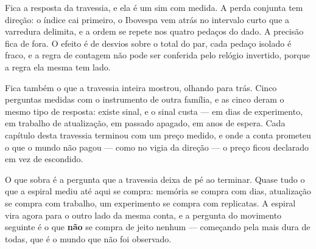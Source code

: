 Fica a resposta da travessia, e ela é um sim com medida. A perda conjunta tem direção: o índice cai
primeiro, o Ibovespa vem atrás no intervalo curto que a varredura delimita, e a ordem se repete nos
quatro pedaços do dado. A precisão fica de fora. O efeito é de \numConjuntaDesvios{} desvios sobre o total do
par, cada pedaço isolado é fraco, e a regra de contagem não pode ser conferida pelo relógio
invertido, porque a regra ela mesma tem lado.

Fica também o que a travessia inteira mostrou, olhando para trás. Cinco perguntas medidas com o
instrumento de outra família, e as cinco deram o mesmo tipo de resposta: existe sinal, e o sinal
custa --- em dias de experimento, em trabalho de atualização, em passado apagado, em anos de espera.
Cada capítulo desta travessia terminou com um preço medido, e onde a conta prometeu o que o mundo
não pagou --- como no vigia da direção --- o preço ficou declarado em vez de escondido.

O que sobra é a pergunta que a travessia deixa de pé ao terminar. Quase tudo o que a espiral mediu
até aqui se compra: memória se compra com dias, atualização se compra com trabalho, um experimento
se compra com replicatas. A espiral vira agora para o outro lado da mesma conta, e a pergunta do
movimento seguinte é o que \textbf{não} se compra de jeito nenhum --- começando pela mais dura de todas,
que é o mundo que não foi observado.
